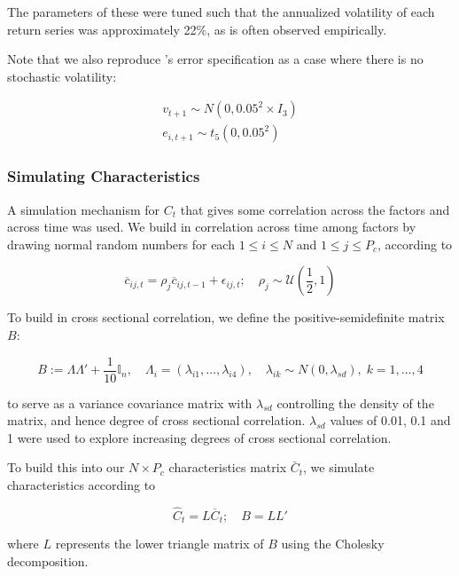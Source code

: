 \documentclass{article}
\begin{document}
The parameters of these were tuned such that the annualized volatility of each return series was approximately 22\%, as is often observed empirically.

Note that we also reproduce \cite{gu_empirical_2018}'s error specification as a case where there is no stochastic volatility:

\begin{align}
v_{t+1} \sim N(0, 0.05^2 \times I_3) \\
e_{i, t+1} \sim t_5(0, 0.05^2)
\end{align}

\subsubsection{Simulating Characteristics}

A simulation mechanism for $C_t$ that gives some correlation across the factors and across time was used. We build in correlation across time among factors by drawing normal random numbers for each $1\leq i\leq N$ and $1\leq j\leq P_{c}$, according to 

\begin{equation}
\overline{c}_{i j, t} = \rho_{j} \overline{c}_{i j, t-1}+\epsilon_{i j, t} ;
\quad \rho_{j} \sim \mathcal{U} \left( \frac{1}{2},1 \right) 
\end{equation}

To build in cross sectional correlation, we define the positive-semidefinite matrix $B$:

\begin{equation}
B:=\Lambda\Lambda' + \frac{1}{10}\mathbb{I}_{n}, \quad
\Lambda_i = (\lambda_{i1},\dots,\lambda_{i4}), \quad
\lambda_{ik}\sim N(0, \lambda_{sd}), \; k=1, \dots, 4
\end{equation}

to serve as a variance covariance matrix with $\lambda_{sd}$ controlling the density of the matrix, and hence degree of cross sectional correlation. $\lambda_{sd}$ values of 0.01, 0.1 and 1 were used to explore increasing degrees of cross sectional correlation.

To build this into our $N\times P_{c}$ characteristics matrix $\bar{C}_t$, we simulate characteristics according to

\begin{equation}
\widehat{C}_{t}=L\overline{C}_{t} ; \quad B = LL' 
\end{equation}

where $L$ represents the lower triangle matrix of $B$ using the Cholesky decomposition.
\end{document}
